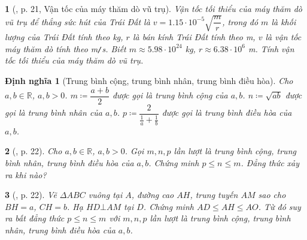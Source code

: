 \documentclass{article}
\newtheorem{baitoan}{}%
\newtheorem{dinhnghia}{Định nghĩa}
\begin{document}
\begin{baitoan}[\cite{Binh_boi_duong_Toan_9_tap_1}, p. 21, Vận tốc của máy thăm dò vũ trụ]
	Vận tốc tối thiểu của máy thăm dò vũ trụ để thắng sức hút của Trái Đất là $v = 1.15\cdot10^{-5}\sqrt{\dfrac{m}{r}}$, trong đó $m$ là khối lượng của Trái Đất tính theo {\rm kg}, $r$ là bán kính Trái Đất tính theo {\rm m}, $v$ là vận tốc máy thăm dò tính theo {\rm m{\tt/}s}. Biết $m\approx5.98\cdot10^{24}$ {\rm kg}, $r\approx6.38\cdot10^6$ {\rm m}. Tính vận tốc tối thiểu của máy thăm dò vũ trụ.
\end{baitoan}

\begin{dinhnghia}[Trung bình cộng, trung bình nhân, trung bình điều hòa]
	Cho $a,b\in\mathbb{R}$, $a,b > 0$. $m\coloneqq\dfrac{a + b}{2}$ được gọi là {\rm trung bình cộng} của $a,b$. $n\coloneqq\sqrt{ab}$ được gọi là {\rm trung bình nhân} của $a,b$. $p\coloneqq\dfrac{2}{\frac{1}{a} + \frac{1}{b}}$ được gọi là {\rm trung bình điều hòa} của $a,b$.
\end{dinhnghia}

\begin{baitoan}[\cite{Binh_boi_duong_Toan_9_tap_1}, p. 22]
	Cho $a,b\in\mathbb{R}$, $a,b > 0$. Gọi $m,n,p$ lần lượt là trung bình cộng, trung bình nhân, trung bình điều hòa của $a,b$. Chứng minh $p\le n\le m$. Đẳng thức xảy ra khi nào?
\end{baitoan}

\begin{baitoan}[\cite{Binh_boi_duong_Toan_9_tap_1}, p. 22]
	Vẽ $\Delta ABC$ vuông tại $A$, đường cao $AH$, trung tuyến $AM$ sao cho $BH = a$, $CH = b$. Hạ $HD\bot AM$ tại $D$. Chứng minh $AD\le AH\le AO$. Từ đó suy ra bất đẳng thức $p\le n\le m$ với $m,n,p$ lần lượt là trung bình cộng, trung bình nhân, trung bình điều hòa của $a,b$.
	\begin{center}
	\end{center}
\end{baitoan}
\end{document}
